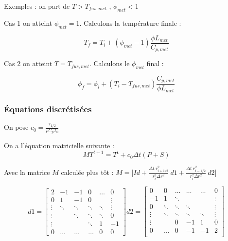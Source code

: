 \documentclass[10pt,a4paper]{article}
\numberwithin{equation}{section}
\begin{document}
Exemples : on part de $T > T_{fus,met}$ , $ \phi_{met} < 1$ 


Cas 1 on atteint $\phi_{met} = 1$. Calculons la température finale : 

\begin{equation}
T_{f} =  T_{i} +  (\phi_{met} - 1 ) \frac{\phi L_{met}}{C_{p,met} }
\end{equation}

Cas 2 on atteint $T = T_{fus,met}$. Calculons le $\phi_{met}$ final : 

\begin{equation}
\phi_{f} =  \phi_{i} +  (T_{i}-T_{fus,met}) \frac{C_{p,met}}{\phi L_{met}}
\end{equation}

\subsubsection{Équations discrétisées}

On pose $c_0 = \frac{\tau_{1/2}}{\rho C_p T_0}$ 

On a l'équation matricielle suivante :
\begin{equation}
MT^{t+1} = T^t + c_0 \Delta t( P + S )
\end{equation}

Avec la matrice $M$ calculée plus tôt : 
$
M = \Big [ Id + \frac{\Delta t ~ r^2_{i+1/2}}{r^2_i \Delta r^2} ~ d1 + \frac{\Delta t ~ r^2_{i-1/2}}{r^2_i \Delta r^2} ~ d2  \Big]
$

\begin{equation}
d1=
\begin{bmatrix}
    2      & -1     & -1        & 0     &\dots      & 0 \\
    0      &  1     & -1        & 0     &           & \vdots  \\
    \vdots & \ddots & \ddots    &\ddots & \ddots    & \vdots \\
    \vdots &        & \ddots    &\ddots & \ddots    & 0 \\
    \vdots &        &           &\ddots & 1         &  -1 \\
    0      & \dots  & \dots     &\dots  & 0         &  0
\end{bmatrix}
d2=
\begin{bmatrix}
     0     & 0      & \dots  & \dots    &\dots      & 0 \\
    -1     & 1      & \ddots &          &           & \vdots  \\
    0      & \ddots & \ddots & \ddots   &           & \vdots \\
    \vdots & \ddots & \ddots & \ddots   & \ddots    & \vdots \\
    \vdots &        & 0      &  -1      &  1        & 0\\
    0      & \dots  & 0      &  -1      & -1        & 2 \\
\end{bmatrix}
\end{equation}
\end{document}
